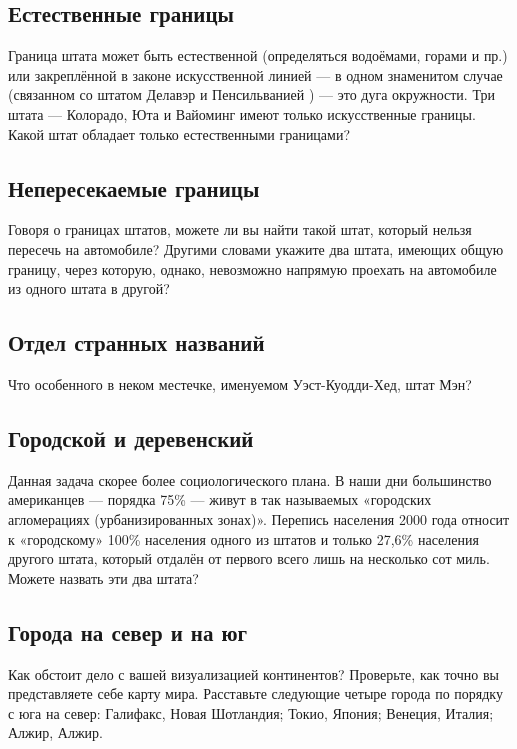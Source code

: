 \subsection*{Естественные границы}%

Граница штата может быть естественной (определяться водоёмами, горами и пр.) или 
закреплённой в законе искусственной линией --- в одном знаменитом случае (связанном со штатом Делавэр и Пенсильванией ) --- это дуга окружности.
Три штата --- Колорадо, Юта и Вайоминг имеют только искусственные границы.
Какой штат обладает только естественными границами?   

\subsection*{Непересекаемые границы}%

Говоря о границах штатов, можете ли вы найти такой штат, который нельзя пересечь на автомобиле? Другими словами укажите два штата, имеющих общую границу, через которую, однако, невозможно напрямую проехать на автомобиле из одного штата в другой?   

\subsection*{Отдел странных названий}%

Что особенного в неком местечке, именуемом Уэст-Куодди-Хед, %
штат Мэн?   

\subsection*{Городской и деревенский}%

Данная задача скорее более социологического плана.
В наши дни большинство американцев --- порядка 75\% --- живут в так называемых «городских агломерациях (урбанизированных зонах)».
Перепись населения 2000 года относит к «городскому» 100\% населения одного из штатов и только 27,6\% населения другого штата, который отдалён от первого всего лишь на несколько сот миль.
Можете назвать эти два штата?   

\subsection*{Города на север и на юг}%

Как обстоит дело с вашей визуализацией континентов?
Проверьте, как точно вы представляете себе %
карту мира.
Расставьте следующие четыре города по порядку с юга на север: 
Галифакс, Новая Шотландия; %
Токио, Япония; %
Венеция, Италия; %
Алжир, Алжир. %

